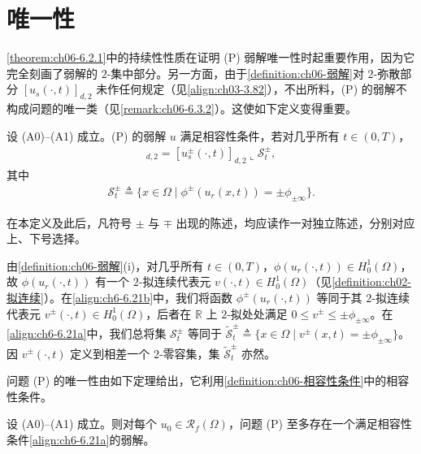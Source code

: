 \documentclass[../../main.tex]{subfiles}%
\begin{document}
\section{唯一性}\label{section:ch06-唯一性}

\cref{theorem:ch06-6.2.1}中的持续性性质在证明 (P) 弱解唯一性时起重要作用，因为它完全刻画了弱解的 $2$-集中部分。另一方面，由于\cref{definition:ch06-弱解}对 $2$-弥散部分 $[u_s(\cdot,t)]_{d,2}$ 未作任何规定（见\eqref{align:ch03-3.82}），不出所料，(P) 的弱解不构成问题的唯一类（见\cref{remark:ch06-6.3.2}）。这使如下定义变得重要。

\begin{definition}\label{definition:ch06-相容性条件}
设 (A0)--(A1) 成立。(P) 的弱解 $u$ 满足相容性条件，若对几乎所有 $t\in(0,T)$，
\begin{align}
[u^\pm_s(\cdot,t)]_{d,2}=[u^\pm_s(\cdot,t)]_{d,2}\llcorner\mathscr{S}^\pm_t, \label{align:ch6-6.21a}
\end{align}
其中
\begin{align}
\mathscr{S}^\pm_t\triangleq \{x\in\Omega\mid\phi^\pm(u_r(x,t))=\pm\phi_{\pm\infty}\}. \label{align:ch6-6.21b}
\end{align}
\end{definition}

在本定义及此后，凡符号 $\pm$ 与 $\mp$ 出现的陈述，均应读作一对独立陈述，分别对应上、下号选择。

\begin{remark}\label{remark:ch06-6.3.1}
由\cref{definition:ch06-弱解}(i)，对几乎所有 $t\in(0,T)$，$\phi(u_r(\cdot,t))\in H^1_0(\Omega)$，故 $\phi(u_r(\cdot,t))$ 有一个 $2$-拟连续代表元 $v(\cdot,t)\in H^1_0(\Omega)$（见\cref{definition:ch02-拟连续}）。在\eqref{align:ch6-6.21b}中，我们将函数 $\phi^\pm(u_r(\cdot,t))$ 等同于其 $2$-拟连续代表元 $v^\pm(\cdot,t)\in H^1_0(\Omega)$，后者在 $\mathbb{R}$ 上 $2$-拟处处满足 $0\leqslant v^\pm\leqslant\pm\phi_{\pm\infty}$。在\eqref{align:ch6-6.21a}中，我们总将集 $\mathscr{S}^\pm_t$ 等同于 $\widetilde{\mathscr{S}}^\pm_t\triangleq \{x\in\Omega\mid v^\pm(x,t)=\pm\phi_{\pm\infty}\}$。因 $v^\pm(\cdot,t)$ 定义到相差一个 $2$-零容集，集 $\widetilde{\mathscr{S}}^\pm_t$ 亦然。
\end{remark}

问题 (P) 的唯一性由如下定理给出，它利用\cref{definition:ch06-相容性条件}中的相容性条件。

\begin{theorem}\label{theorem:ch06-6.3.1}
设 (A0)--(A1) 成立。则对每个 $u_0\in\mathscr{R}_f(\Omega)$，问题 (P) 至多存在一个满足相容性条件\eqref{align:ch6-6.21a}的弱解。
\end{theorem}
\end{document}
